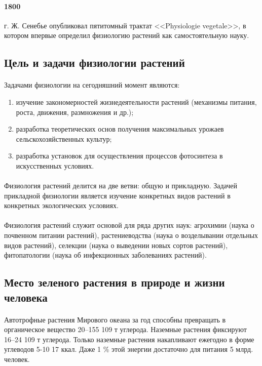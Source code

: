 \paragraph*{1800} г. Ж. Сенебье опубликовал пятитомный трактат <<Physiologie vegetale>>, в котором впервые определил физиологию растений как самостоятельную науку.

\subsection*{Цель и задачи физиологии растений}



\paragraph*{}Задачами физиологии на сегодняшний момент являются:

\begin{enumerate}

	\item изучение закономерностей жизнедеятельности растений (механизмы питания, роста, движения, размножения и др.); 
	\item разработка теоретических основ получения максимальных урожаев сельскохозяйственных культур; 
	\item разработка установок для осуществления процессов фотосинтеза в искусственных условиях.

\end{enumerate}

\paragraph*{}Физиология растений делится на две ветви: общую и прикладную. Задачей прикладной физиологии является изучение конкретных видов растений в конкретных экологических условиях.

\paragraph*{}Физиология растений служит основой для ряда других наук: агрохимии (наука о почвенном питании растений), растениеводства (наука о возделывании отдельных видов растений), селекции (наука о выведении новых сортов растений), фитопатологии (наука об инфекционных заболеваниях растений).

\subsection*{Место зеленого растения в природе и жизни человека}

\paragraph*{}Автотрофные растения Мирового океана за год способны превращать в органическое вещество 20–155 109 т углерода. Наземные растения фиксируют 16–24 109 т углерода. 
Только наземные растения накапливают ежегодно в форме углеводов 5-10 17 ккал. Даже 1 \% этой энергии достаточно для питания 5 млрд. человек. 
